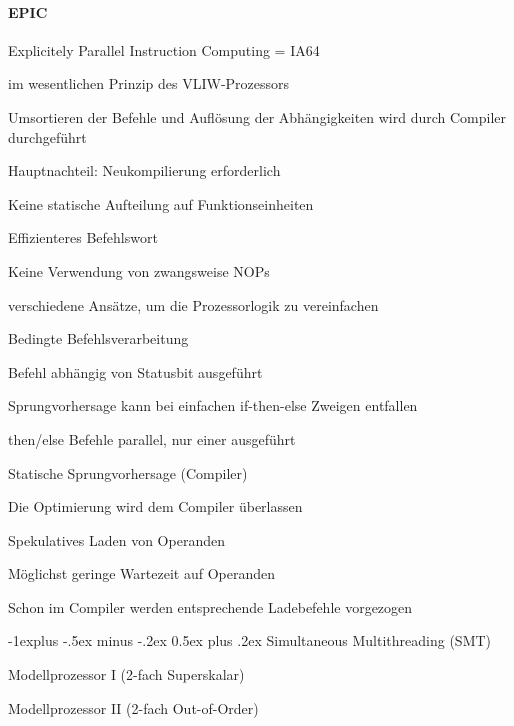\documentclass[10pt,landscape]{article}
\makeatletter
\renewcommand{\subsection}{\@startsection{subsection}{2}{0mm}%
                                {-1explus -.5ex minus -.2ex}%
                                {0.5ex plus .2ex}%
                                {\normalfont\normalsize\bfseries}}
\makeatother
\begin{document}
\begin{multicols}{3}
  \paragraph{EPIC} Explicitely Parallel Instruction Computing = IA64
  \begin{itemize*}
    \item im wesentlichen Prinzip des VLIW-Prozessors
    \item Umsortieren der Befehle und Auflösung der Abhängigkeiten wird durch Compiler durchgeführt
    \item Hauptnachteil: Neukompilierung erforderlich
    \item Keine statische Aufteilung auf Funktionseinheiten
    \item Effizienteres Befehlswort
    \item Keine Verwendung von zwangsweise NOPs
  \end{itemize*}
  verschiedene Ansätze, um die Prozessorlogik zu vereinfachen
  \begin{enumerate*}
    \item Bedingte Befehlsverarbeitung
    \begin{itemize*}
      \item Befehl abhängig von Statusbit ausgeführt
      \item Sprungvorhersage kann bei einfachen if-then-else Zweigen entfallen
      \item then/else Befehle parallel, nur einer ausgeführt
    \end{itemize*}
    \item Statische Sprungvorhersage (Compiler)
    \item Die Optimierung wird dem Compiler überlassen
    \item Spekulatives Laden von Operanden
    \begin{itemize*}
      \item Möglichst geringe Wartezeit auf Operanden
      \item Schon im Compiler werden entsprechende Ladebefehle vorgezogen
    \end{itemize*}
  \end{enumerate*}
  
  \subsection{Simultaneous Multithreading (SMT)}
  \begin{itemize*}
    \item Modellprozessor I (2-fach Superskalar)
    \item Modellprozessor II (2-fach Out-of-Order)
  \end{itemize*}
  

\end{multicols}
\end{document}
